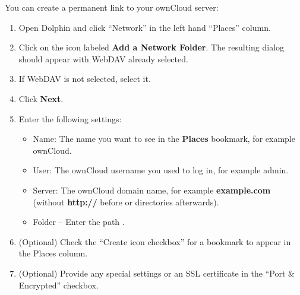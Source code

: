 \documentclass[letterpaper,10pt,english]{sphinxmanual}
\begin{document}
You can create a permanent link to your ownCloud server:
\begin{enumerate}
\item {} 
Open Dolphin and click ``Network'' in the left hand ``Places'' column.

\item {} 
Click on the icon labeled \textbf{Add a Network Folder}.
The resulting dialog should appear with WebDAV already selected.

\item {} 
If WebDAV is not selected, select it.

\item {} 
Click \textbf{Next}.

\item {} 
Enter the following settings:
\begin{itemize}
\item {} 
Name: The name you want to see in the \textbf{Places} bookmark, for example ownCloud.

\item {} 
User: The ownCloud username you used to log in, for example admin.

\item {} 
Server: The ownCloud domain name, for example \textbf{example.com} (without
\textbf{http://} before or directories afterwards).

\item {} 
Folder -- Enter the path .

\end{itemize}

\item {} 
(Optional) Check the ``Create icon checkbox'' for a bookmark to appear in the
Places column.

\item {} 
(Optional) Provide any special settings or an SSL certificate in the ``Port \&
Encrypted'' checkbox.

\end{enumerate}
\end{document}
